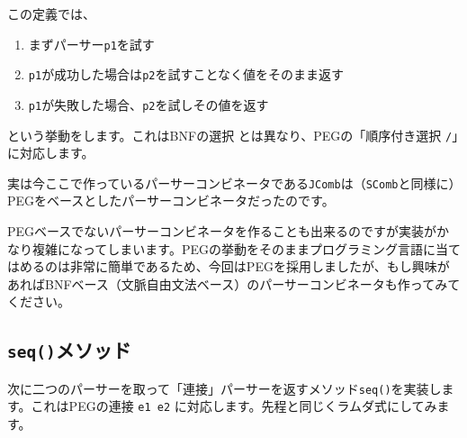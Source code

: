 この定義では、

\begin{enumerate}
\def\labelenumi{\arabic{enumi}.}
\tightlist
\item
  まずパーサー\texttt{p1}を試す
\item
  \texttt{p1}が成功した場合は\texttt{p2}を試すことなく値をそのまま返す
\item
  \texttt{p1}が失敗した場合、\texttt{p2}を試しその値を返す
\end{enumerate}

という挙動をします。これはBNFの選択 \texttt{\textbar{}}
とは異なり、PEGの「順序付き選択 \texttt{/}」に対応します。

実は今ここで作っているパーサーコンビネータである\texttt{JComb}は（\texttt{SComb}と同様に）PEGをベースとしたパーサーコンビネータだったのです。

PEGベースでないパーサーコンビネータを作ることも出来るのですが実装がかなり複雑になってしまいます。PEGの挙動をそのままプログラミング言語に当てはめるのは非常に簡単であるため、今回はPEGを採用しましたが、もし興味があればBNFベース（文脈自由文法ベース）のパーサーコンビネータも作ってみてください。

\hypertarget{chapter6-sequx30e1ux30bdux30c3ux30c9}{%
\subsection{\texorpdfstring{\texttt{seq()}メソッド}{seq()メソッド}}\label{chapter6-sequx30e1ux30bdux30c3ux30c9}}

次に二つのパーサーを取って「連接」パーサーを返すメソッド\texttt{seq()}を実装します。これはPEGの連接
\texttt{e1\ e2} に対応します。先程と同じくラムダ式にしてみます。

